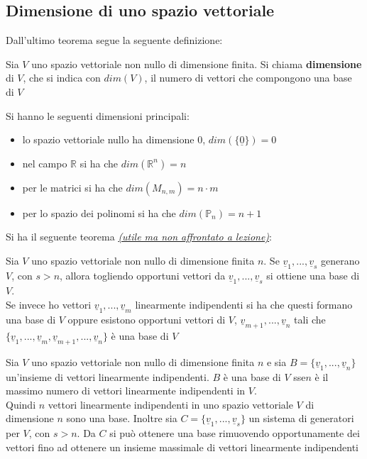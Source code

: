 \documentclass[a4paper,12pt, oneside]{book}
\begin{document}
\subsection{Dimensione di uno spazio vettoriale}
Dall'ultimo teorema segue la seguente definizione:
\begin{definizione}
Sia $V$ uno spazio vettoriale non nullo di dimensione finita. Si chiama \textbf{dimensione} di $V$, che si indica con $dim(V)$, il numero di vettori che compongono una base di $V$
\end{definizione}
Si hanno le seguenti dimensioni principali:
\begin{itemize}
\item lo spazio vettoriale nullo ha dimensione 0, $dim(\{\underline{0}\})=0$
\item nel campo $\mathbb{R}$ si ha che $dim(\mathbb{R}^n)=n$
\item per le matrici si ha che $dim(M_{n,m})=n\cdot m$
\item per lo spazio dei polinomi si ha che $dim (\mathbb{P}_n)=n+1$
\end{itemize}
\begin{shaded}
Si ha il seguente teorema \textit{\underline{(utile ma non affrontato a lezione)}}:
\begin{teorema} 
Sia $V$ uno spazio vettoriale non nullo di dimensione finita $n$. Se $\underline{v}_1,...,\underline{v}_s$ generano $V$, con $s>n$, allora togliendo opportuni vettori da $\underline{v}_1,...,\underline{v}_s$ si ottiene una base di $V$.\\
Se invece ho vettori $\underline{v}_1,...,\underline{v}_m$ linearmente indipendenti si ha che questi formano una base di $V$ oppure esistono opportuni vettori di $V$, $\underline{v}_{m+1},...,\underline{v}_n$ tali che $\{\underline{v}_1,...,\underline{v}_m,\underline{v}_{m+1},...,\underline{v}_n\}$ è una base di $V$
\end{teorema}
\end{shaded}
\begin{teorema}
Sia $V$ uno spazio vettoriale non nullo di dimensione finita $n$ e sia $B=\{\underline{v}_1,...,\underline{v}_n\}$ un'insieme di vettori linearmente indipendenti. $B$ è una base di $V$ sse$n$ è il massimo numero di vettori linearmente indipendenti in $V$.\\
Quindi $n$ vettori linearmente indipendenti in uno spazio vettoriale $V$ di dimensione $n$ sono una base. Inoltre sia $C=\{\underline{v}_1,...,\underline{v}_s\}$ un sistema di generatori per $V$, con $s>n$. Da $C$ si può ottenere una base rimuovendo opportunamente dei vettori fino ad ottenere un insieme massimale di vettori linearmente indipendenti
\end{teorema}
\end{document}
